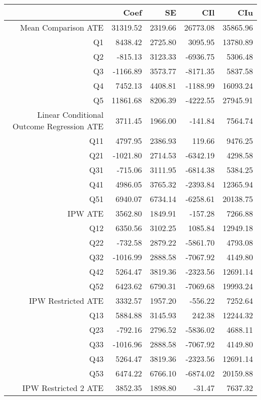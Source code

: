 \begin{table}[ht]
\centering
\begin{tabular}{rrrrr}
  \hline
 & Coef & SE & CIl & CIu \\ 
  \hline
Mean Comparison ATE & 31319.52 & 2319.66 & 26773.08 & 35865.96 \\ 
  Q1 & 8438.42 & 2725.80 & 3095.95 & 13780.89 \\ 
  Q2 & -815.13 & 3123.33 & -6936.75 & 5306.48 \\ 
  Q3 & -1166.89 & 3573.77 & -8171.35 & 5837.58 \\ 
  Q4 & 7452.13 & 4408.81 & -1188.99 & 16093.24 \\ 
  Q5 & 11861.68 & 8206.39 & -4222.55 & 27945.91 \\ 
  Linear Conditional Outcome Regression ATE & 3711.45 & 1966.00 & -141.84 & 7564.74 \\ 
  Q11 & 4797.95 & 2386.93 & 119.66 & 9476.25 \\ 
  Q21 & -1021.80 & 2714.53 & -6342.19 & 4298.58 \\ 
  Q31 & -715.06 & 3111.95 & -6814.38 & 5384.25 \\ 
  Q41 & 4986.05 & 3765.32 & -2393.84 & 12365.94 \\ 
  Q51 & 6940.07 & 6734.14 & -6258.61 & 20138.75 \\ 
  IPW ATE & 3562.80 & 1849.91 & -157.28 & 7266.88 \\ 
  Q12 & 6350.56 & 3102.25 & 1085.84 & 12949.18 \\ 
  Q22 & -732.58 & 2879.22 & -5861.70 & 4793.08 \\ 
  Q32 & -1016.99 & 2888.58 & -7067.92 & 4149.80 \\ 
  Q42 & 5264.47 & 3819.36 & -2323.56 & 12691.14 \\ 
  Q52 & 6423.62 & 6790.31 & -7069.68 & 19993.24 \\ 
  IPW Restricted ATE & 3332.57 & 1957.20 & -556.22 & 7252.64 \\ 
  Q13 & 5884.88 & 3145.93 & 242.38 & 12244.32 \\ 
  Q23 & -792.16 & 2796.52 & -5836.02 & 4688.11 \\ 
  Q33 & -1016.96 & 2888.58 & -7067.92 & 4149.80 \\ 
  Q43 & 5264.47 & 3819.36 & -2323.56 & 12691.14 \\ 
  Q53 & 6474.22 & 6766.10 & -6874.02 & 20159.88 \\ 
  IPW Restricted 2 ATE & 3852.35 & 1898.80 & -31.47 & 7637.32 \\ 

\end{tabular}
\end{table}
